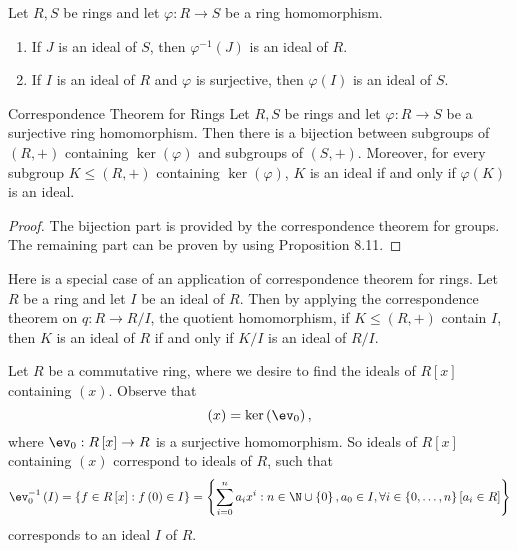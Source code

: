 \documentclass[pmath347]{subfiles}
\begin{document}
    \begin{prop}{}
        Let $R,S$ be rings and let $\varphi:R\to S$ be a ring homomorphism.
        \begin{enumerate}
            \item If $J$ is an ideal of $S$, then $\varphi^{-1} \left( J \right)$ is an ideal of $R$.

            \item If $I$ is an ideal of $R$ and $\varphi$ is surjective, then $\varphi\left( I \right)$ is an ideal of $S$.
        \end{enumerate}
    \end{prop}

    \begin{theorem}{Correspondence Theorem for Rings}
        Let $R,S$ be rings and let $\varphi:R\to S$ be a surjective ring homomorphism. Then there is a bijection between subgroups of $\left( R,+ \right)$ containing $\ker\left( \varphi \right)$ and subgroups of $\left( S,+ \right)$. Moreover, for every subgroup $K\leq \left( R,+ \right)$ containing $\ker\left( \varphi \right)$, $K$ is an ideal if and only if $\varphi\left( K \right)$ is an ideal.
    \end{theorem}

    \begin{proof}
        The bijection part is provided by the correspondence theorem for groups. The remaining part can be proven by using Proposition 8.11.
    \end{proof}
    
    \np Here is a special case of an application of correspondence theorem for rings. Let $R$ be a ring and let $I$ be an ideal of $R$. Then by applying the correspondence theorem on $q:R\to R /I$, the quotient homomorphism, if $K\leq \left( R,+ \right)$ contain $I$, then $K$ is an ideal of $R$ if and only if $K /I$ is an ideal of $R /I$.

    \ex Let $R$ be a commutative ring, where we desire to find the ideals of $R\left[ x \right]$ containing $\left( x \right)$. Observe that
    \begin{equation*}
        \left( x \right) = \ker\left( \ev_0 \right) ,
    \end{equation*}
    where $\ev_0 : R\left[ x \right] \to R$ is a surjective homomorphism. So ideals of $R\left[ x \right]$ containing $\left( x \right)$ correspond to ideals of $R$, such that
    \begin{equation*}
        \ev_0^{-1} \left( I \right) = \left\lbrace f\in R\left[ x \right] :f\left( 0 \right) \in I \right\rbrace = \left\lbrace \sum^{n}_{i=0} a_ix^i:n\in\N\cup\left\lbrace 0 \right\rbrace , a_0\in I, \forall i\in\left\lbrace 0,\ldots,n \right\rbrace \left[ a_i\in R \right]  \right\rbrace 
    \end{equation*}
    corresponds to an ideal $I$ of $R$.
\end{document}

